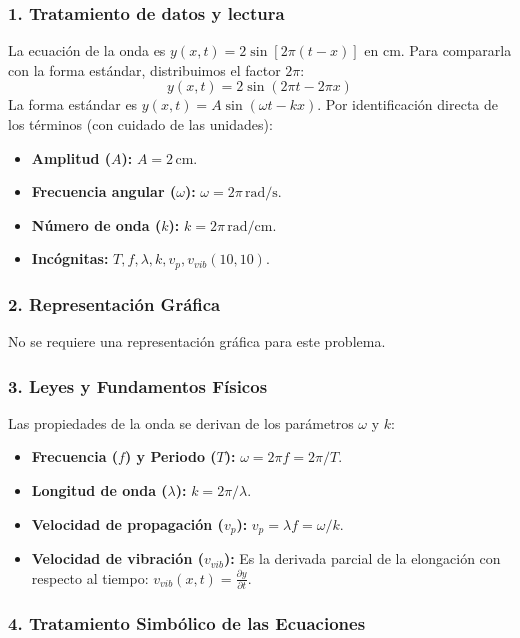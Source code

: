 \subsubsection*{1. Tratamiento de datos y lectura}
La ecuación de la onda es $y(x,t) = 2\sin[2\pi(t-x)]$ en cm.
Para compararla con la forma estándar, distribuimos el factor $2\pi$:
$$y(x,t) = 2\sin(2\pi t - 2\pi x)$$
La forma estándar es $y(x,t) = A\sin(\omega t - kx)$. Por identificación directa de los términos (con cuidado de las unidades):
\begin{itemize}
    \item \textbf{Amplitud ($A$):} $A = 2\,\text{cm}$.
    \item \textbf{Frecuencia angular ($\omega$):} $\omega = 2\pi\,\text{rad/s}$.
    \item \textbf{Número de onda ($k$):} $k = 2\pi\,\text{rad/cm}$.
    \item \textbf{Incógnitas:} $T, f, \lambda, k, v_p, v_{vib}(10, 10)$.
\end{itemize}

\subsubsection*{2. Representación Gráfica}
No se requiere una representación gráfica para este problema.

\subsubsection*{3. Leyes y Fundamentos Físicos}
Las propiedades de la onda se derivan de los parámetros $\omega$ y $k$:
\begin{itemize}
    \item \textbf{Frecuencia ($f$) y Periodo ($T$):} $\omega = 2\pi f = 2\pi/T$.
    \item \textbf{Longitud de onda ($\lambda$):} $k = 2\pi/\lambda$.
    \item \textbf{Velocidad de propagación ($v_p$):} $v_p = \lambda f = \omega/k$.
    \item \textbf{Velocidad de vibración ($v_{vib}$):} Es la derivada parcial de la elongación con respecto al tiempo: $v_{vib}(x,t) = \frac{\partial y}{\partial t}$.
\end{itemize}

\subsubsection*{4. Tratamiento Simbólico de las Ecuaciones}
